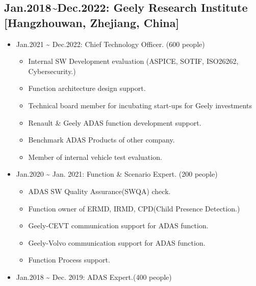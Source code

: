 \documentclass[12pt,a4paper]{article}
\begin{document}
\subsection{Jan.2018{\textasciitilde}Dec.2022: Geely Research Institute [Hangzhouwan, Zhejiang, China]}
\begin{itemize}
\item Jan.2021 {\textasciitilde} Dec.2022: Chief Technology Officer. (600 people)

\begin{itemize}
\item Internal SW Development evaluation (ASPICE, SOTIF, ISO26262, Cybersecurity.)


\item Function architecture design support.


\item Technical board member for incubating start-ups for Geely investments


\item Renault \& Geely ADAS function development support.


\item Benchmark ADAS Products of other company.


\item Member of internal vehicle test evaluation.

\end{itemize}

\item Jan.2020 {\textasciitilde} Jan. 2021: Function \& Scenario Expert. (200 people)

\begin{itemize}
\item ADAS SW Quality Assurance(SWQA) check.


\item Function owner of ERMD, IRMD, CPD(Child Presence Detection.)


\item Geely-CEVT communication support for ADAS function.


\item Geely-Volvo communication support for ADAS function.


\item Function Process support. 

\end{itemize}

\item Jan.2018 {\textasciitilde} Dec. 2019: ADAS Expert.(400 people)


\end{itemize}
\end{document}

